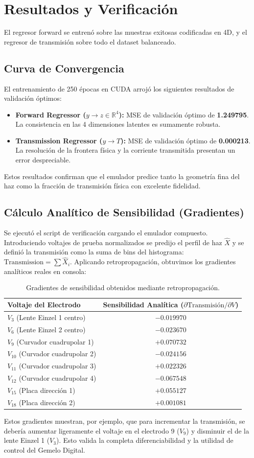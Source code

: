 \documentclass[12pt,letterpaper]{article}
\begin{document}
\section{Resultados y Verificación}
El regresor forward se entrenó sobre las muestras exitosas codificadas en 4D, y el regresor de transmisión sobre todo el dataset balanceado.

\subsection{Curva de Convergencia}
El entrenamiento de 250 épocas en CUDA arrojó los siguientes resultados de validación óptimos:
\begin{itemize}
    \item \textbf{Forward Regressor ($y \to z \in \mathbb{R}^4$):} MSE de validación óptimo de \textbf{1.249795}. La consistencia en las 4 dimensiones latentes es sumamente robusta.
    \item \textbf{Transmission Regressor ($y \to T$):} MSE de validación óptimo de \textbf{0.000213}. La resolución de la frontera física y la corriente transmitida presentan un error despreciable.
\end{itemize}
Estos resultados confirman que el emulador predice tanto la geometría fina del haz como la fracción de transmisión física con excelente fidelidad.

\subsection{Cálculo Analítico de Sensibilidad (Gradientes)}
Se ejecutó el script de verificación cargando el emulador compuesto. Introduciendo voltajes de prueba normalizados se predijo el perfil de haz $\hat{X}$ y se definió la transmisión como la suma de bins del histograma: $\text{Transmission} = \sum \hat{X}_i$. Aplicando retropropagación, obtuvimos los gradientes analíticos reales en consola:
\begin{table}[H]
    \centering
    \caption{Gradientes de sensibilidad obtenidos mediante retropropagación.}
    \begin{tabular}{lc}
        \toprule
        \textbf{Voltaje del Electrodo} & \textbf{Sensibilidad Analítica ($\partial \text{Transmisión} / \partial V$)} \\
        \midrule
        $V_3$ (Lente Einzel 1 centro) & $-0.019970$ \\
        $V_6$ (Lente Einzel 2 centro) & $-0.023670$ \\
        $V_9$ (Curvador cuadrupolar 1) & $+0.070732$ \\
        $V_{10}$ (Curvador cuadrupolar 2) & $-0.024156$ \\
        $V_{11}$ (Curvador cuadrupolar 3) & $+0.022326$ \\
        $V_{12}$ (Curvador cuadrupolar 4) & $-0.067548$ \\
        $V_{15}$ (Placa dirección 1) & $+0.055127$ \\
        $V_{18}$ (Placa dirección 2) & $+0.001081$ \\
        \bottomrule
    \end{tabular}
\end{table}

Estos gradientes muestran, por ejemplo, que para incrementar la transmisión, se debería aumentar ligeramente el voltaje en el electrodo 9 ($V_9$) y disminuir el de la lente Einzel 1 ($V_3$). Esto valida la completa diferenciabilidad y la utilidad de control del Gemelo Digital.
\end{document}
